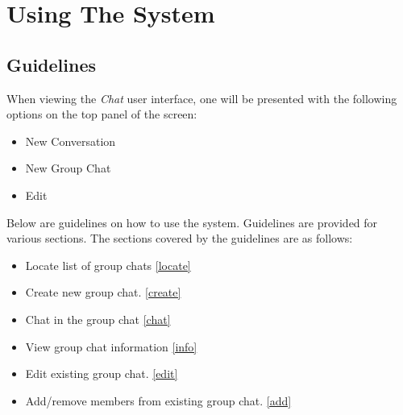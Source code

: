 \documentclass[11pt]{article}
\begin{document}
\section{Using The System}
\subsection{Guidelines}
When viewing the \textit{Chat} user interface, one will be presented with the following options on the top panel of the screen:
\begin{itemize}
\item New Conversation
\item New Group Chat
\item Edit
\end{itemize}
Below are guidelines on how to use the system. Guidelines are provided for various sections. The sections covered by the guidelines are as follows:

\begin{itemize}
\item Locate list of group chats \ref{locate}
\item Create new group chat. \ref{create}
\item Chat in the group chat \ref{chat}
\item View group chat information \ref{info}
\item Edit existing group chat. \ref{edit}
\item Add/remove members from existing group chat. \ref{add}
\end{itemize}
\end{document}
